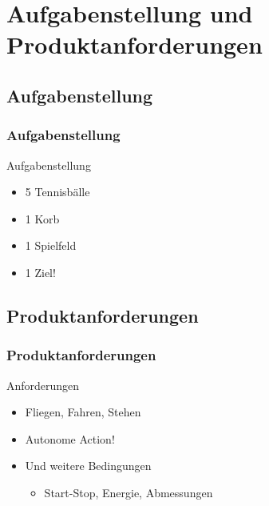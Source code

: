 \section{Aufgabenstellung und Produktanforderungen} %
\subsection{Aufgabenstellung}
\begin{frame}
    \frametitle{Aufgabenstellung}
	\begin{block}{Aufgabenstellung}
	    \begin{itemize}
	    	\item 5 Tennisbälle
	    	\item 1 Korb
		    \item 1 Spielfeld
		    \item 1 Ziel!
	    \end{itemize}
    \end{block}
\end{frame}
\subsection{Produktanforderungen}
\begin{frame}
    \frametitle{Produktanforderungen}
    \begin{block}{Anforderungen}
	     \begin{itemize}
	     	\item Fliegen, Fahren, Stehen
	     	\item Autonome Action!
	     	\item Und weitere Bedingungen
	     	\begin{itemize}
	     		\item Start-Stop, Energie, Abmessungen
	     	\end{itemize}
	     \end{itemize}
    \end{block}
\end{frame}
